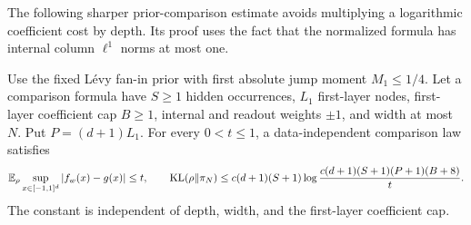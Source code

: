 The following sharper prior-comparison estimate avoids multiplying a logarithmic coefficient cost by depth. Its proof uses the fact that the normalized formula has internal column $\ell^1$ norms at most one.

\begin{lemma}
\label{lem:contracting-formula-comparison}
Use the fixed L\'evy fan-in prior with first absolute jump moment $M_1\le1/4$. Let a comparison formula have $S\ge1$ hidden occurrences, $L_1$ first-layer nodes, first-layer coefficient cap $B\ge1$, internal and readout weights $\pm1$, and width at most $N$. Put $P=(d+1)L_1$. For every $0<t\le1$, a data-independent comparison law satisfies
\[
 \mathbb E_\rho\sup_{x\in[-1,1]^d}|f_w(x)-g(x)|\le t,
 \qquad
 \operatorname{KL}(\rho\|\pi_N)
 \le c(d+1)(S+1)\log\frac{c(d+1)(S+1)(P+1)(B+8)}t.
\]
The constant is independent of depth, width, and the first-layer coefficient cap.
\end{lemma}
